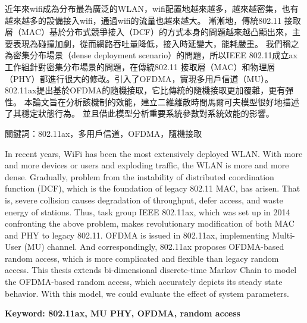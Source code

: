 \begin{abstractzh}
近年來wifi成為分布最為廣泛的WLAN，wifi配置地越來越多，越來越密集，也有越來越多的設備接入wifi，通過wifi的流量也越來越大。
漸漸地，傳統802.11 接取層（MAC）基於分布式競爭接入（DCF）的方式本身的問題越來越凸顯出來，主要表現為碰撞加劇，從而網路吞吐量降低，接入時延變大，能耗嚴重。
我們稱之為密集分布場景（dense deployment scenario）的問題，所以IEEE 802.11成立ax工作組針對密集分布場景的問題，在傳統802.11 接取層（MAC）和物理層（PHY）都進行很大的修改。引入了OFDMA，實現多用戶信道（MU）。
802.11ax提出基於OFDMA的隨機接取，它比傳統的隨機接取更加覆雜，更有彈性。
本論文旨在分析該機制的效能，建立二維離散時間馬爾可夫模型很好地描述了其穩定狀態行為。
並且借此模型分析重要系統參數對系統效能的影響。

\noindent
關鍵詞：802.11ax，多用戶信道，OFDMA，隨機接取
\end{abstractzh}

\begin{abstracten}
In recent years, WiFi has been the most extensively deployed WLAN. 
With more and more devices or users and exploding traffic, the WLAN is more and more dense. 
Gradually, problem from the instability of distributed coordination function (DCF), which is the foundation of legacy 802.11 MAC, has arisen. 
That is, severe collision causes degradation of throughput, defer access, and waste energy of stations. 
Thus, task group IEEE 802.11ax, which was set up in 2014 confronting the above problem, makes revolutionary modification of both MAC and PHY to legacy 802.11. 
OFDMA is issued in 802.11ax, implementing Multi-User (MU) channel. 
And correspondingly, 802.11ax proposes OFDMA-based random access, which is more complicated and flexible than legacy random access. 
This thesis extends bi-dimensional discrete-time Markov Chain to model the OFDMA-based random access, which accurately depicts its steady state behavior. 
With this model, we could evaluate the effect of system parameters.



\noindent
\textbf{Keyword: 802.11ax, MU PHY, OFDMA, random access}
\end{abstracten}

\begin{comment}
\category{I2.10}{Computing Methodologies}{Artificial Intelligence --
Vision and Scene Understanding} \category{H5.3}{Information
Systems}{Information Interfaces and Presentation (HCI) -- Web-based
Interaction.}

\terms{Design, Human factors, Performance.}

\keywords{802.11ax, MU PHY, OFDMA, random access}
\end{comment}
